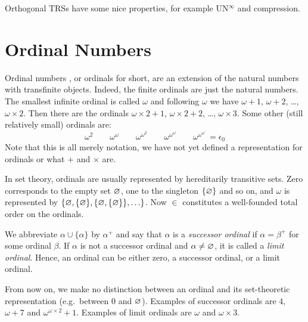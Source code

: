 Orthogonal TRSs have some nice properties, for example UN$^{\infty}$ and
compression.



\section{Ordinal Numbers}

Ordinal numbers \citep{cantor-15}, or ordinals for short, are an
extension of the natural numbers with transfinite objects. Indeed, the
finite ordinals are just the natural numbers. The smallest infinite
ordinal is called $\omega$ and following $\omega$ we have $\omega +
1$, $\omega + 2$, \ldots, $\omega \times 2$. Then there are the
ordinals $\omega \times 2 + 1$, $\omega \times 2 + 2$, \ldots, $\omega
\times 3$. Some other (still relatively small) ordinals are:
\begin{displaymath}
  \omega^2 \qquad
  \omega^\omega \qquad
  \omega^{\omega^2} \qquad
  \omega^{\omega^\omega} \qquad
  \omega^{\omega^{\omega^{\iddots}}} = \epsilon_0
\end{displaymath}
Note that this is all merely notation, we have not yet defined a
representation for ordinals or what $+$ and $\times$ are.

In set theory, ordinals are usually represented by hereditarily transitive
sets. Zero corresponds to the empty set $\varnothing$, one to the
singleton $\{ \varnothing \}$ and so on, and $\omega$ is represented by
$\{ \varnothing, \{ \varnothing \}, \{ \varnothing, \{ \varnothing \} \} , \ldots
\}$. Now $\in$ constitutes a well-founded total order on the
ordinals.

We abbreviate $\alpha \cup \{ \alpha \}$ by $\alpha^+$ and say that
$\alpha$ is a \emph{successor ordinal} if $\alpha = \beta^+$ for some
ordinal $\beta$. If $\alpha$ is not a successor ordinal and $\alpha
\neq \varnothing$, it is called a \emph{limit ordinal}. Hence, an ordinal
can be either zero, a successor ordinal, or a limit ordinal.

From now on, we make no distinction between an ordinal and its set-theoretic
representation (e.g.\ between $0$ and $\varnothing$). Examples of successor
ordinals are $4$, $\omega + 7$  and $\omega^{\omega \times 2} + 1$. Examples
of limit ordinals are $\omega$ and $\omega \times 3$.


